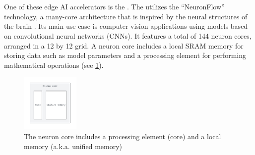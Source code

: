 \section{\graicore{}}

One of these edge AI accelerators is the \graicore{}.
The \graicore{} utilizes the ``NeuronFlow'' technology, a many-core architecture that is inspired by the neural structures of the brain \cite{moreiraNeuronFlowNeuromorphicProcessor2020}.
Its main use case is computer vision applications using models based on convolutional neural networks (CNNs).
It features a total of 144 neuron cores, arranged in a 12 by 12 grid.
A neuron core includes a local SRAM memory for storing data such as model parameters and a processing element for performing mathematical operations (see \cref{fig:neuron_core}).

\begin{figure}[htbp]
    \centering
    \includegraphics[width=0.25\textwidth]{assets/neuron_core.pdf}
    \caption{The neuron core includes a processing element (core) and a local memory (a.k.a. unified memory)}
    \label{fig:neuron_core}
\end{figure}

